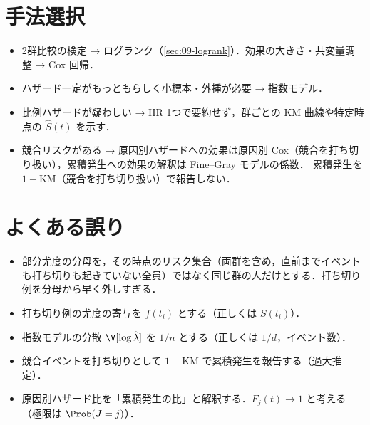 \section{手法選択}\label{sec:10-choice}
\begin{itemize}
\item 2群比較の検定 → ログランク（\cref{sec:09-logrank}）．効果の大きさ・共変量調整 → Cox 回帰．
\item ハザード一定がもっともらしく小標本・外挿が必要 → 指数モデル．
\item 比例ハザードが疑わしい → HR 1つで要約せず，群ごとの KM 曲線や特定時点の $\hat S(t)$ を示す．
\item 競合リスクがある → 原因別ハザードへの効果は原因別 Cox（競合を打ち切り扱い），累積発生への効果の解釈は Fine--Gray モデルの係数．
      累積発生を $1-\mathrm{KM}$（競合を打ち切り扱い）で報告しない．
\end{itemize}

\section{よくある誤り}\label{sec:10-err}
\begin{warnbox}
\begin{itemize}
\item 部分尤度の分母を，その時点のリスク集合（両群を含め，直前までイベントも打ち切りも起きていない全員）ではなく同じ群の人だけとする．打ち切り例を分母から早く外しすぎる．
\item 打ち切り例の尤度の寄与を $f(t_i)$ とする（正しくは $S(t_i)$）．
\item 指数モデルの分散 $\V[\log\hat\lambda]$ を $1/n$ とする（正しくは $1/d$，イベント数）．
\item 競合イベントを打ち切りとして $1-\mathrm{KM}$ で累積発生を報告する（過大推定）．
\item 原因別ハザード比を「累積発生の比」と解釈する．$F_j(t)\to1$ と考える（極限は $\Prob(J=j)$）．
\end{itemize}
\end{warnbox}

